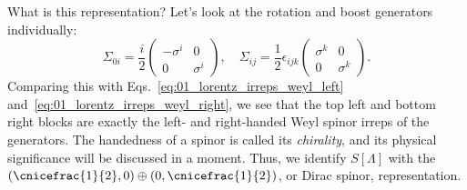 What is this representation?
Let's look at the rotation and boost generators individually:
\begin{equation}
	\label{eq:01_qft_spinors_spinor_generators}
	\Sigma_{0i} = \frac{i}{2} \begin{pmatrix} -\sigma^i & 0 \\ 0 & \sigma^i \end{pmatrix}, \quad
	\Sigma_{ij} = \frac{1}{2} \epsilon_{ijk} \begin{pmatrix} \sigma^k & 0 \\ 0 & \sigma^k \end{pmatrix}.
\end{equation}
Comparing this with Eqs.~\ref{eq:01_lorentz_irreps_weyl_left} and~\ref{eq:01_lorentz_irreps_weyl_right}, we see that the top left and bottom right blocks are exactly the left- and right-handed Weyl spinor irreps of the generators.
The handedness of a spinor is called its \textit{chirality}, and its physical significance will be discussed in a moment.
Thus, we identify $S[\Lambda]$ with the $(\cnicefrac{1}{2},0) \oplus (0,\cnicefrac{1}{2})$, or Dirac spinor, representation.

